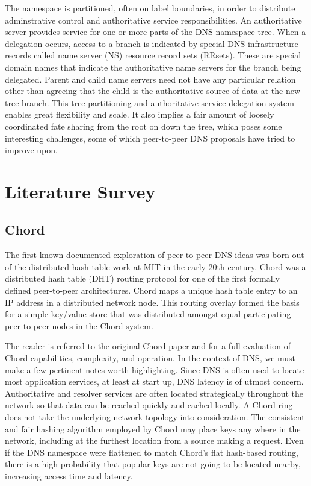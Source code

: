 \documentclass[sigconf]{acmart}
\begin{document}
The namespace is partitioned, often on label boundaries, in order to
distribute adminstrative control and authoritative service
responsibilities.  An authoritative server provides service for one or
more parts of the DNS namespace tree.  When a delegation occurs, access
to a branch is indicated by special DNS infrastructure records called
name server (NS) resource record sets (RRsets).  These are special
domain names that indicate the authoritative name servers for the branch
being delegated.  Parent and child name servers need not have any
particular relation other than agreeing that the child is the
authoritative source of data at the new tree branch.  This tree
partitioning and authoritative service delegation system enables great
flexibility and scale.  It also implies a fair amount of loosely
coordinated fate sharing from the root on down the tree, which poses
some interesting challenges, some of which peer-to-peer DNS proposals
have tried to improve upon.

\section{Literature Survey}

\subsection{Chord}

The first known documented exploration of peer-to-peer DNS ideas was
born out of the distributed hash table work at MIT in the early 20th
century.  Chord was a distributed hash table (DHT) routing protocol for
one of the first formally defined peer-to-peer
architectures.\cite{stoica_chord:_2001}  Chord maps a unique hash table
entry to an IP address in a distributed network node.  This routing
overlay formed the basis for a simple key/value store that was
distributed amongst equal participating peer-to-peer nodes in the Chord
system.

The reader is referred to the original Chord paper and
\cite{kshemkalyani_distributed_2011} for a full evaluation of Chord
capabilities, complexity, and operation.  In the context of DNS, we must
make a few pertinent notes worth highlighting.  Since DNS is often used
to locate most application services, at least at start up, DNS latency
is of utmost concern.  Authoritative and resolver services are often
located strategically throughout the network so that data can be reached
quickly and cached locally.  A Chord ring does not take the underlying
network topology into consideration.  The consistent and fair hashing
algorithm employed by Chord may place keys any where in the network,
including at the furthest location from a source making a request.  Even
if the DNS namespace were flattened to match Chord's flat hash-based
routing, there is a high probability that popular keys are not going to
be located nearby, increasing access time and latency.
\end{document}
